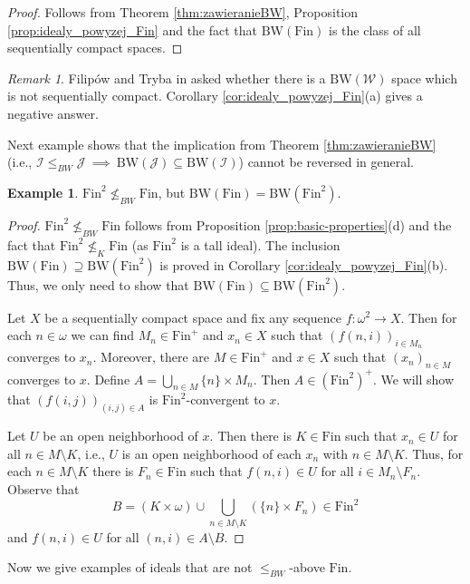 \documentclass{amsart}
\theoremstyle{plain}
\theoremstyle{definition}
\newtheorem{example}[theorem]{Example}
\theoremstyle{remark}
\newtheorem{remark}[theorem]{Remark}
\newcommand{\cI}{\mathcal{I}}
\newcommand{\I}{\cI}
\newcommand{\cJ}{\mathcal{J}}
\newcommand{\J}{\cJ}
\newcommand{\fin}{\mathrm{Fin}}
\newcommand{\Fin}{\mathrm{Fin}}
\newcommand{\BW}{\mathrm{BW}}
\begin{document}
\begin{proof}
Follows from Theorem \ref{thm:zawieranieBW}, Proposition \ref{prop:idealy_powyzej_Fin} and the fact that $\BW(\Fin)$ is the class of all sequentially compact spaces.
\end{proof}

\begin{remark}
Filip\'{o}w and Tryba in \cite[Question 3]{FT} asked whether there is a $\BW(\mathcal{W})$ space which is not sequentially compact. Corollary \ref{cor:idealy_powyzej_Fin}(a) gives a negative answer.
\end{remark}

Next example shows that the implication from Theorem \ref{thm:zawieranieBW} (i.e., $\I\leq_{BW}\J\ \implies\ \BW(\J)\subseteq\BW(\I)$) cannot be reversed in general.

\begin{example}
\label{ex:Fin^2}
$\Fin^2\not\leq_{BW}\Fin$, but $\BW(\Fin)=\BW(\Fin^2)$. 
\end{example}

\begin{proof}
$\Fin^2\not\leq_{BW}\Fin$ follows from Proposition \ref{prop:basic-properties}(d) and the fact that $\Fin^2\not\leq_{K}\Fin$ (as $\Fin^2$ is a tall ideal). The inclusion $\BW(\Fin)\supseteq\BW(\Fin^2)$ is proved in Corollary \ref{cor:idealy_powyzej_Fin}(b). Thus, we only need to show that $\BW(\Fin)\subseteq\BW(\Fin^2)$.

Let $X$ be a sequentially compact space and fix any sequence $f:\omega^2\to X$. Then for each $n\in\omega$ we can find $M_n\in\fin^+$ and $x_n\in X$ such that $(f(n,i))_{i\in M_n}$ converges to $x_n$. Moreover, there are $M\in\Fin^+$ and $x\in X$ such that $(x_n)_{n\in M}$ converges to $x$. Define $A=\bigcup_{n\in M}\{n\}\times M_n$. Then $A\in(\fin^2)^+$. We will show that $(f(i,j))_{(i,j)\in A}$ is $\fin^2$-convergent to $x$. 

Let $U$ be an open neighborhood of $x$. Then there is $K\in\fin$ such that $x_n\in U$ for all $n\in M\setminus K$, i.e., $U$ is an open neighborhood of each $x_n$ with $n\in M\setminus K$. Thus, for each $n\in M\setminus K$ there is $F_n\in\fin$ such that $f(n,i)\in U$ for all $i\in M_n\setminus F_n$. Observe that
\[
B=(K\times\omega)\cup\bigcup_{n\in M\setminus K}(\{n\}\times F_n)\in\Fin^2
\]
and $f(n,i)\in U$ for all $(n,i)\in A\setminus B$.
\end{proof}

Now we give examples of ideals that are not $\leq_{BW}$-above $\Fin$.
\end{document}
